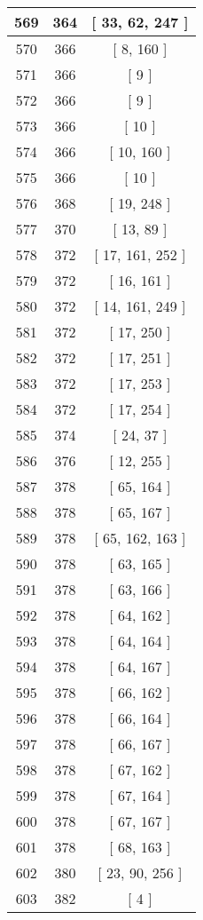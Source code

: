 \begin{center}
\begin{longtable}[H]{|| c c c ||}
569 & 364 & [ 33, 62, 247 ] \\ 
\hline
570 & 366 & [ 8, 160 ] \\ 
\hline
571 & 366 & [ 9 ] \\ 
\hline
572 & 366 & [ 9 ] \\ 
\hline
573 & 366 & [ 10 ] \\ 
\hline
574 & 366 & [ 10, 160 ] \\ 
\hline
575 & 366 & [ 10 ] \\ 
\hline
576 & 368 & [ 19, 248 ] \\ 
\hline
577 & 370 & [ 13, 89 ] \\ 
\hline
578 & 372 & [ 17, 161, 252 ] \\ 
\hline
579 & 372 & [ 16, 161 ] \\ 
\hline
580 & 372 & [ 14, 161, 249 ] \\ 
\hline
581 & 372 & [ 17, 250 ] \\ 
\hline
582 & 372 & [ 17, 251 ] \\ 
\hline
583 & 372 & [ 17, 253 ] \\ 
\hline
584 & 372 & [ 17, 254 ] \\ 
\hline
585 & 374 & [ 24, 37 ] \\ 
\hline
586 & 376 & [ 12, 255 ] \\ 
\hline
587 & 378 & [ 65, 164 ] \\ 
\hline
588 & 378 & [ 65, 167 ] \\ 
\hline
589 & 378 & [ 65, 162, 163 ] \\ 
\hline
590 & 378 & [ 63, 165 ] \\ 
\hline
591 & 378 & [ 63, 166 ] \\ 
\hline
592 & 378 & [ 64, 162 ] \\ 
\hline
593 & 378 & [ 64, 164 ] \\ 
\hline
594 & 378 & [ 64, 167 ] \\ 
\hline
595 & 378 & [ 66, 162 ] \\ 
\hline
596 & 378 & [ 66, 164 ] \\ 
\hline
597 & 378 & [ 66, 167 ] \\ 
\hline
598 & 378 & [ 67, 162 ] \\ 
\hline
599 & 378 & [ 67, 164 ] \\ 
\hline
600 & 378 & [ 67, 167 ] \\ 
\hline
601 & 378 & [ 68, 163 ] \\ 
\hline
602 & 380 & [ 23, 90, 256 ] \\ 
\hline
603 & 382 & [ 4 ] \\ 

\end{longtable}
\end{center}
